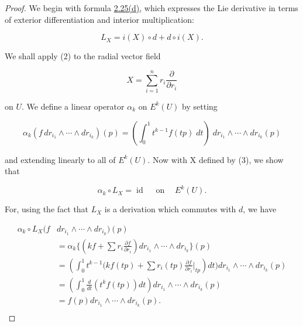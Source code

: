 \begin{proof}
We begin with formula \hyperref[thm:2.25]{2.25(d)}, which expresses the Lie derivative in terms of exterior differentiation and interior multiplication:

\begin{equation}
\tag{2}\label{eq:4.18:2}
L_{X}=i(X)\circ d+d\circ i(X).
\end{equation}

We shall apply (2) to the radial vector field

\begin{equation}
\tag{3}\label{eq:4.18:3}
X=\sum_{i=1}^{n}r_{i}\frac{\partial}{\partial r_{i}}
\end{equation}

on $U$. We define a linear operator $\alpha_{k}$ on $E^{k}(U)$ by setting

\begin{equation}
\tag{4}\label{eq:4.18:4}
\alpha_{k}(f\,dr_{i_{1}}\wedge\cdots\wedge dr_{i_{k}})(p)=\left(\int_{0}^{1}t^{k-1}f(t p)\;d t\right)\;d r_{i_{1}}\wedge\cdots\wedge d r_{i_{k}}(p)
\end{equation}

and extending linearly to all of  $ E^{k}(U) $. Now with X defined by (3), we show that

\begin{equation}
\tag{5}\label{eq:4.18:5}
\alpha_{k}\circ L_{X}=\operatorname{id}\quad\operatorname{on}\quad E^{k}(U).
\end{equation}

For, using the fact that $L_{X}$ is a derivation which commutes with $d$, we have

\begin{equation}
\tag{6}\label{eq:4.18:6}
\begin{aligned}{\alpha_{k}\circ L_{X}(f}&{{}dr_{i_{1}}\wedge\cdots\wedge dr_{i_{k}})(p)}\\ {}&{{}=\alpha_{k}\bigg\{\left(k f+\sum r_{i}\frac{\partial f}{\partial r_{i}}\right)dr_{i_{1}}\wedge\cdots\wedge dr_{i_{k}}\bigg\}(p)}\\ {}&{{}=\left(\int_{0}^{1}t^{k-1}\bigg(k f(t p)+\sum r_{i}(t p)\frac{\partial f}{\partial r_{i}}\bigg|_{t p}\right)d t\bigg)dr_{i_{1}}\wedge\cdots\wedge dr_{i_{k}}(p)}\\ {}&{{}=\left(\int_{0}^{1}\frac{d}{d t}\left(t^{k}f(t p)\right)d t\right)dr_{i_{1}}\wedge\cdots\wedge dr_{i_{k}}(p)}\\ {}&{{}=f(p)dr_{i_{1}}\wedge\cdots\wedge dr_{i_{k}}(p).}\\ \end{aligned}
\end{equation}


\end{proof}
